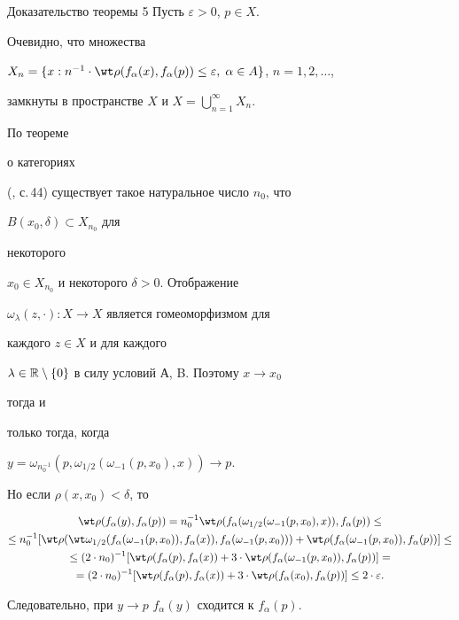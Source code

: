  


\begin{pf*}{Доказательство теоремы 5} Пусть $\varepsilon>0$, $p\in X$. 


Очевидно, что множества 


$X_n=\{x:n^{-1}\cdot\wt\rho(f_\alpha(x),f_\alpha(p))\le\varepsilon,\; 


\alpha\in A\}$, $n=1,2,\dotsc$, 


замкнуты в пространстве $X$ и $X=\bigcup\limits^\infty_{n=1}X_n$. 


По теореме 


о категориях 


(\cite{Sad}, с.\,44) существует такое натуральное число $n_0$, что 


$B(x_0,\delta)\subset X_{n_0}$ для 


некоторого 


$x_0\in X_{n_0}$ и некоторого $\delta>0$. Отображение 


$\omega_\lambda(z,\cdot):X\to X$ является гомеоморфизмом для 


каждого $z\in X$ и для каждого 


$\lambda\in\Bbb R\setminus\{0\}$ в силу условий А, B. Поэтому $x\to x_0$ 


тогда и 


только тогда, когда 


$y=\omega_{n_0^{-1}}(p,\omega_{1/2}(\omega_{-1}(p,x_0),x))\to p$. 


Но если $\rho(x,x_0)<\delta$, то 


\begin{gather*} 


\wt\rho(f_\alpha(y),f_\alpha(p))=n_0^{-1}\wt\rho(f_\alpha(\omega_{1/2} 


(\omega_{-1}(p,x_0),x)),f_\alpha(p))\le \\ 


% 


\le n_0^{-1}[\wt\rho(\wt\omega_{1/2}(f_\alpha(\omega_{-1} 


(p,x_0)),f_\alpha(x)),f_\alpha(\omega_{-1}(p,x_0))) 


+\wt\rho(f_\alpha(\omega_{-1}(p,x_0)),f_\alpha(p))]\le \\ 


% 


\le(2\cdot n_0)^{-1}[\wt\rho(f_\alpha(p),f_\alpha(x))+ 


3\cdot\wt\rho(f_\alpha(\omega_{-1}(p,x_0)),f_\alpha(p))]= \\ 


% 


=(2\cdot n_0)^{-1}[\wt\rho(f_\alpha(p),f_\alpha(x))+ 


3\cdot\wt\rho(f_\alpha(x_0),f_\alpha(p))]\le2\cdot\varepsilon. 


\end{gather*} 


Следовательно, при $y\to p$ $f_\alpha(y)$ сходится к $f_\alpha(p)$.


\end{pf*} 


